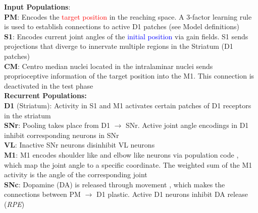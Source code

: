 \justifying
\textbf{\textcolor{training-set}{Input Populations}}:\\[2pt]
\footnotesize
\textbf{PM}: Encodes the \textcolor{red}{target position} in the reaching space. A 3-factor learning rule is used to establish connections to active D1 patches (see Model definitions)\\[2pt]
\textbf{S1}: Encodes current joint angles of the \textcolor{blue}{initial position} via gain fields. S1 sends projections that diverge to innervate multiple regions in the Striatum (D1 patches) \parencite{flahertyCorticostriatalTransformationsPrimate1991}\\[2pt]
\textbf{CM}: Centro median nuclei located in the intralaminar nuclei sends proprioceptive information of the target position into the M1. This connection is deactivated in the test phase\\[10pt]
\small
\textbf{Recurrent Populations:}\\[2pt]
\footnotesize
\textbf{D1} (Striatum): Activity in S1 and M1 activates certain patches of D1 receptors in the striatum\\[2pt]
\textbf{SNr}: Pooling takes place from D1 $\rightarrow$ SNr. Active joint angle encodings in D1 inhibit corresponding neurons in SNr\\[2pt]
\textbf{VL}: Inactive SNr neurons disinhibit VL neurons\\[2pt]
\textbf{M1}: M1 encodes shoulder like and elbow like neurons via population code 
\parencite{pruszynskiPrimaryMotorCortex2011}, which map the joint angle to a specific coordinate. The weighted sum of the M1 activity is the angle of the corresponding joint\\[2pt]
\textbf{SNc}: Dopamine (DA) is released through movement \parencite{cheungLearningCriticallyDrives2023}, which makes the connections between PM $\rightarrow$ D1 plastic. Active D1 neurons inhibit DA release (\textit{RPE})
